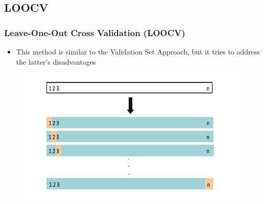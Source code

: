 \documentclass[
  shownotes,
  xcolor={svgnames},
  hyperref={colorlinks,citecolor=DarkBlue,linkcolor=DarkRed,urlcolor=DarkBlue}
  ]{beamer}
\begin{document}
\subsection{LOOCV}
\begin{frame}[fragile]
\frametitle{Leave-One-Out Cross Validation (LOOCV)}

\begin{itemize}
\item This method is similar to the Validation Set Approach, but it tries to address the latter’s disadvantages 
\end{itemize}

 \begin{figure}[H] \centering
            \captionsetup{justification=centering}
              \includegraphics[scale=0.7]{figures/fig53.png}
       \end{figure}


\end{frame}
\end{document}
